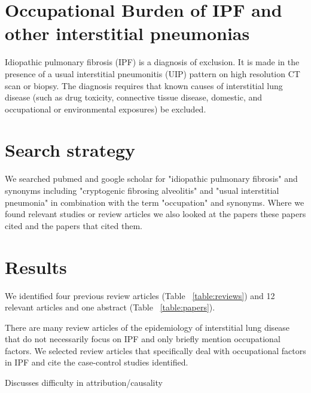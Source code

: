 \documentclass[a4paper,12pt]{article}
\author{Carl Reynolds \\
\small National Heart \& Lung Institute, Imperial College London }
\begin{document}


\section*{\centering Occupational Burden of IPF and other interstitial pneumonias}

Idiopathic pulmonary fibrosis (IPF) is a diagnosis of exclusion. It is made in the
presence of a usual interstitial pneumonitis (UIP) pattern on high resolution CT scan
or biopsy. The diagnosis requires that known causes of interstitial lung disease
(such as drug toxicity, connective tissue disease, domestic, and occupational or
environmental exposures) be excluded\cite{Travis2013}.



\section{Search strategy}

We searched pubmed and google scholar for "idiopathic pulmonary fibrosis" and synonyms including "cryptogenic fibrosing alveolitis" and "usual interstitial pneumonia" in combination with the term "occupation" and synonyms. Where we found relevant studies or review articles we also looked at the papers these papers cited and the papers that cited them. 

\section{Results}

We identified four previous review articles (Table ~\ref{table:reviews})\cite{Turner-Warwick1998} and 12 relevant articles and one abstract (Table ~\ref{table:papers}).

There are many review articles of the epidemiology of interstitial lung disease that do not necessarily focus on IPF and only briefly mention occupational factors. We selected review articles that specifically deal with occupational factors in IPF and cite the case-control studies identified.



%
\cite{Turner-Warwick1998} Discusses difficulty in attribution/causality
\end{document}
